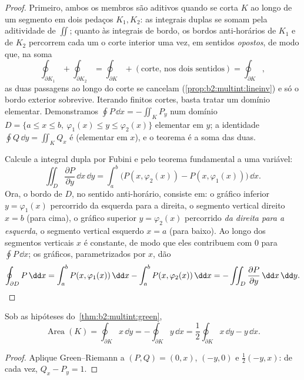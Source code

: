 \begin{proof}
Primeiro, ambos os membros são aditivos quando se corta $K$ ao longo de um
segmento em dois pedaços $K_1, K_2$: as integrais duplas se somam
pela aditividade de $\iint$; quanto às integrais de bordo, os
bordos anti-horários de $K_1$ e de $K_2$ percorrem cada um
o corte interior uma vez, em sentidos \emph{opostos}, de modo que, na
soma
\[
\oint_{\partial K_1} + \oint_{\partial K_2}
= \oint_{\partial K} + (\text{corte, nos dois sentidos})
= \oint_{\partial K},
\]
as duas passagens ao longo do corte se cancelam
(\cref{prop:b2:multint:lineinv}) e só o bordo exterior
sobrevive. Iterando finitos cortes, basta tratar
um domínio elementar. Demonstramos $\oint P\,\dd x = -\iint_K P_y$ num
domínio $D = \{a \leq x \leq b,\ \varphi_1(x) \leq y
\leq \varphi_2(x)\}$ elementar em $y$; a identidade $\oint Q\,\dd y = \iint_K Q_x$
é  (elementar em $x$), e o teorema é a soma das duas.

Calcule a integral dupla por Fubini e pelo teorema fundamental
a uma variável:
\[
\iint_D \frac{\partial P}{\partial y}\,\dd x\,\dd y
= \int_a^b \bigl(P(x, \varphi_2(x)) - P(x, \varphi_1(x))\bigr)
\,\dd x .
\]
Ora, o bordo de $D$, no sentido anti-horário, consiste em: o gráfico
inferior $y = \varphi_1(x)$ percorrido da esquerda para a direita, o segmento
vertical direito $x = b$ (para cima), o gráfico superior $y =
\varphi_2(x)$ percorrido \emph{da direita para a esquerda}, o segmento
vertical esquerdo $x = a$ (para baixo). Ao longo dos segmentos verticais $x$ é
constante, de modo que eles contribuem com $0$ para $\oint P\,\dd x$; os gráficos,
parametrizados por $x$, dão
\[
\oint_{\partial D} P\,\dd x
= \int_a^b P(x, \varphi_1(x))\,\dd x
- \int_a^b P(x, \varphi_2(x))\,\dd x
= -\iint_D \frac{\partial P}{\partial y}\,\dd x\,\dd y .
\qedhere
\]
\end{proof}

\begin{corollary}\label{cor:b2:multint:area}
Sob as hipóteses do~\cref{thm:b2:multint:green},
\[
\operatorname{Area}(K)
= \oint_{\partial K} x\,\dd y
= -\oint_{\partial K} y\,\dd x
= \frac12\oint_{\partial K} x\,\dd y - y\,\dd x .
\]
\end{corollary}

\begin{proof}
Aplique Green--Riemann a $(P, Q) = (0, x)$, $(-y, 0)$ e
$\frac12(-y, x)$: de cada vez, $Q_x - P_y = 1$.
\end{proof}

